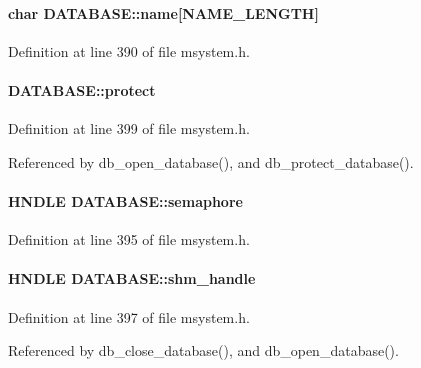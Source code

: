 \paragraph[{name}]{\setlength{\rightskip}{0pt plus 5cm}char {\bf DATABASE::name}\mbox{[}NAME\_\-LENGTH\mbox{]}}\hfill\label{structDATABASE_a805e328e89f54b5692b793ef1f4b7e05}


Definition at line 390 of file msystem.h.
\paragraph[{protect}]{ {\bf DATABASE::protect}}\hfill\label{structDATABASE_a19cb247aa5af46b316cc04fafc7ba950}


Definition at line 399 of file msystem.h.

Referenced by db\_\-open\_\-database(), and db\_\-protect\_\-database().
\paragraph[{semaphore}]{\setlength{\rightskip}{0pt plus 5cm}HNDLE {\bf DATABASE::semaphore}}\hfill\label{structDATABASE_a684fa2c3b31e068299c149db02d1d4fa}


Definition at line 395 of file msystem.h.
\paragraph[{shm\_\-handle}]{\setlength{\rightskip}{0pt plus 5cm}HNDLE {\bf DATABASE::shm\_\-handle}}\hfill\label{structDATABASE_a7221e5431ce5b569a8c0212c8c46cb1c}


Definition at line 397 of file msystem.h.

Referenced by db\_\-close\_\-database(), and db\_\-open\_\-database().